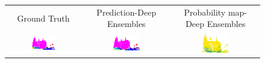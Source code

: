     \begin{figure}[h!]
        \centering
        \begin{tabular}{ccc}
            Ground Truth & Prediction-Deep Ensembles & Probability map-Deep Ensembles \\
            \includegraphics[width=0.33\textwidth, height=0.18\textheight]{images/seg_output/sem3d_seg_output/1_GT.png} &
            \includegraphics[width=0.33\textwidth, height=0.18\textheight]{images/seg_output/sem3d_seg_output/1_Pred.png}& 
            \includegraphics[width=0.33\textwidth, height=0.18\textheight]{images/seg_output/sem3d_seg_output/1_max_prob.png}\\


\end{tabular}
\end{figure}
